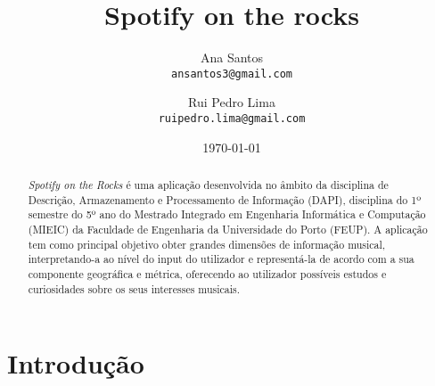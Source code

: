 \documentclass[twocolumn,twoside,11pt,a4paper]{article}
\title{\vspace{-15mm}\fontsize{24pt}{10pt}\selectfont\textbf{Spotify on the rocks}}
\author{Ana Santos\\
\small \texttt{ansantos3@gmail.com}\\
\and
Rui Pedro Lima\\
\small \texttt{ruipedro.lima@gmail.com}
\vspace{-5mm}
}
\date{\today}
\begin{document}
\maketitle
\thispagestyle{plain}            %


\begin{abstract}


\textit{Spotify on the Rocks} é uma aplicação desenvolvida no âmbito da disciplina de
Descrição, Armazenamento e Processamento de Informação (DAPI), disciplina do 1º
semestre do 5º ano do Mestrado Integrado em Engenharia Informática e Computação
(MIEIC) da Faculdade de Engenharia da Universidade do Porto (FEUP).
A aplicação tem como principal objetivo obter grandes dimensões de informação
musical, interpretando-a ao nível do input do utilizador e representá-la de acordo com
a sua componente geográfica e métrica, oferecendo ao utilizador possíveis estudos e
curiosidades sobre os seus interesses musicais.

\end{abstract}


\section{Introdução}\label{sec:intro}

\end{document}
